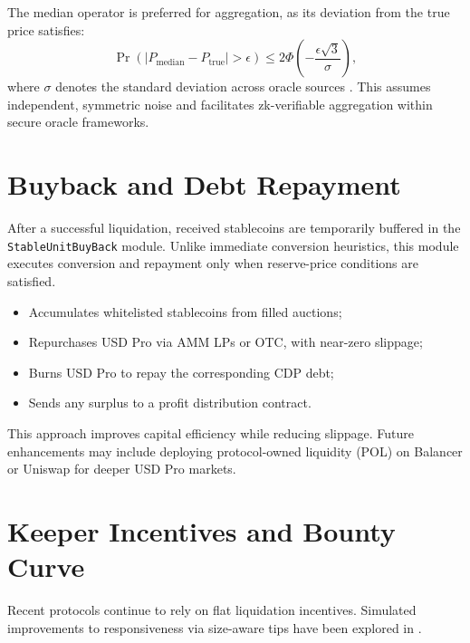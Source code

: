 \documentclass[11pt]{article}
\begin{document}
\medskip

The median operator is preferred for aggregation, as its deviation from the true price satisfies:
\[
\Pr\left(\left| P_{\text{median}} - P_{\text{true}} \right| > \epsilon\right) \leq 2\Phi\left(-\frac{\epsilon\sqrt{3}}{\sigma}\right),
\]
where \( \sigma \) denotes the standard deviation across oracle sources \parencite{eskandari2021sok}. This assumes independent, symmetric noise and facilitates zk-verifiable aggregation within secure oracle frameworks.


\section{Buyback and Debt Repayment}
\label{sec:buyback}
After a successful liquidation, received stablecoins are temporarily buffered in the \texttt{StableUnitBuyBack} module.  
Unlike immediate conversion heuristics, this module executes conversion and repayment only when reserve-price conditions are satisfied.

\begin{itemize}
  \item Accumulates whitelisted stablecoins from filled auctions;
  \item Repurchases USD Pro via AMM LPs or OTC, with near-zero slippage;
  \item Burns USD Pro to repay the corresponding CDP debt;
  \item Sends any surplus to a profit distribution contract.
\end{itemize}

This approach improves capital efficiency while reducing slippage.  
Future enhancements may include deploying protocol-owned liquidity (POL) on Balancer or Uniswap for deeper USD Pro markets.

\section{Keeper Incentives and Bounty Curve}
\label{sec:keeper}
Recent protocols \parencite{aave-liquidation-docs, compound-liquidation-docs, makerdao-auctions-docs} continue to rely on flat liquidation incentives. Simulated improvements to responsiveness via size-aware tips have been explored in \textcite{kirillov2022stablesims}.
\end{document}
